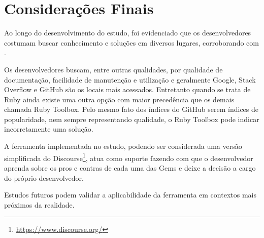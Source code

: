 \chapter{Considerações Finais}

Ao longo do desenvolvimento do estudo, foi evidenciado que os desenvolvedores costumam buscar conhecimento e soluções em diversos lugares, corroborando com \cite{parnin2012crowd}.

Os desenvolvedores buscam, entre outras qualidades, por qualidade de documentação, facilidade de manutenção e utilização e geralmente Google, Stack Overflow e GitHub são os locais mais acessados. Entretanto quando se trata de Ruby ainda existe uma outra opção com maior precedência que os demais chamada Ruby Toolbox. Pelo mesmo fato dos índices do GitHub serem índices de popularidade, nem sempre representando qualidade, o Ruby Toolbox pode indicar incorretamente uma solução.

A ferramenta implementada no estudo, podendo ser considerada uma versão simplificada do Discourse\footnote{\url{https://www.discourse.org/}}, atua como suporte fazendo com que o desenvolvedor aprenda sobre os pros e contras de cada uma das Gems e deixe a decisão a cargo do próprio desenvolvedor.

Estudos futuros podem validar a aplicabilidade da ferramenta em contextos mais próximos da realidade.